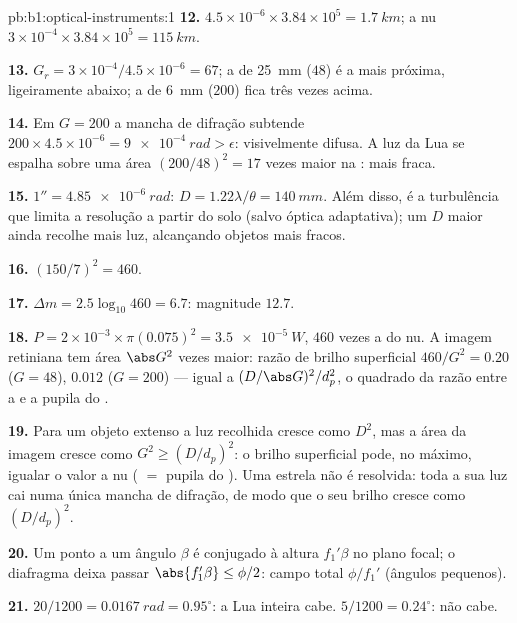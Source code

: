 \begin{solution}{pb:b1:optical-instruments:1}
\textbf{12.} $4.5\times10^{-6} \times 3.84\times10^5 = \qty{1.7}{km}$;
a  nu $3\times10^{-4} \times 3.84\times10^5 = \qty{115}{km}$.

\textbf{13.} $G_r = 3\times10^{-4}/4.5\times10^{-6} = 67$; a  de \qty{25}{mm}
($48$) é a mais próxima, ligeiramente abaixo; a de \qty{6}{mm} ($200$) fica
três vezes acima.

\textbf{14.} Em $G = 200$ a mancha de difração subtende $200 \times 4.5
\times10^{-6} = \qty{9e-4}{rad} > \epsilon$: visivelmente difusa. A luz da
Lua se espalha sobre uma área $(200/48)^2 = 17$ vezes maior na
: mais fraca.

\textbf{15.} $1'' = \qty{4.85e-6}{rad}$: $D = 1.22\lambda/\theta =
\qty{140}{mm}$. Além disso, é a turbulência que limita a resolução a partir do solo
(salvo óptica adaptativa); um $D$ maior ainda recolhe mais luz,
alcançando objetos mais fracos.

\textbf{16.} $(150/7)^2 = 460$.

\textbf{17.} $\Delta m = 2.5\log_{10}460 = 6.7$: magnitude $12.7$.

\textbf{18.} $P = 2\times10^{-3} \times \pi(0.075)^2 = \qty{3.5e-5}{W}$,
$460$ vezes a do  nu. A imagem retiniana tem área $\abs G^2$ vezes
maior: razão de brilho superficial $460/G^2 = 0.20$ ($G = 48$),
$0.012$ ($G = 200$) --- igual a $(D/\abs G)^2/d_p^2$, o quadrado da razão
entre a  e a pupila do .

\textbf{19.} Para um objeto extenso a luz recolhida cresce como $D^2$,
mas a área da imagem cresce como $G^2 \geq (D/d_p)^2$: o brilho superficial pode,
no máximo, igualar o valor a  nu ( $=$ pupila do ). Uma estrela
não é resolvida: toda a sua luz cai numa única mancha de difração, de modo que o seu
brilho cresce como $(D/d_p)^2$.

\textbf{20.} Um ponto a um ângulo $\beta$ é conjugado à altura $f_1'\beta$ no
plano focal; o diafragma deixa passar $\abs{f_1'\beta} \leq \phi/2$: campo
total $\phi/f_1'$ (ângulos pequenos).

\textbf{21.} $20/1200 = \qty{0.0167}{rad} = 0.95^\circ$: a Lua inteira
cabe. $5/1200 = 0.24^\circ$: não cabe.


\end{solution}
